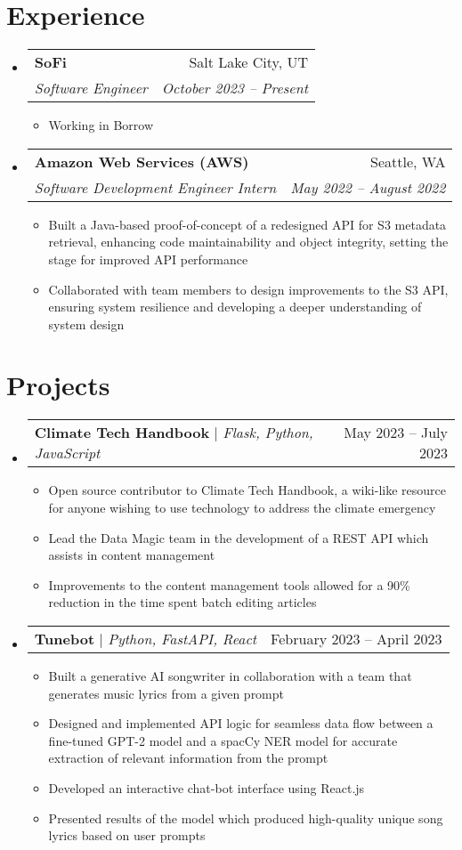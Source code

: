 \documentclass[letterpaper,11pt]{article}
\makeatletter
\newcommand{\resumeItem}[1]{
  \item\small{
    {#1 \vspace{-2pt}}
  }
}
\newcommand{\resumeSubheading}[4]{
  \vspace{-2pt}\item
    \begin{tabular*}{0.97\textwidth}[t]{l@{\extracolsep{\fill}}r}
      \textbf{#1} & #2 \\
      \textit{\small#3} & \textit{\small #4} \\
    \end{tabular*}\vspace{-7pt}
}
\newcommand{\resumeSubSubheading}[2]{
    \item
    \begin{tabular*}{0.97\textwidth}{l@{\extracolsep{\fill}}r}
      \textit{\small#1} & \textit{\small #2} \\
    \end{tabular*}\vspace{-7pt}
}
\newcommand{\resumeProjectHeading}[2]{
    \item
    \begin{tabular*}{0.97\textwidth}{l@{\extracolsep{\fill}}r}
      \small#1 & #2 \\
    \end{tabular*}\vspace{-7pt}
}
\newcommand{\resumeSubHeadingListStart}{\begin{itemize}[leftmargin=0.15in, label={}]}
\newcommand{\resumeSubHeadingListEnd}{\end{itemize}}
\newcommand{\resumeItemListStart}{\begin{itemize}}
\newcommand{\resumeItemListEnd}{\end{itemize}\vspace{-5pt}}
\makeatother
\begin{document}
\section{Experience}
  \resumeSubHeadingListStart
  \resumeSubheading
      {SoFi}{Salt Lake City, UT}
      {Software Engineer}{October 2023 -- Present}
      \resumeItemListStart
        \resumeItem{Working in Borrow}
     \resumeItemListEnd

    \resumeSubheading
      {Amazon Web Services (AWS)}{Seattle, WA}
      {Software Development Engineer Intern}{May 2022 -- August 2022}
      \resumeItemListStart
        \resumeItem{Built a Java-based proof-of-concept of a redesigned API for S3 metadata retrieval, enhancing code maintainability and object integrity, setting the stage for improved API performance}
        \resumeItem{
        Collaborated with team members to design improvements to the S3 API, ensuring system resilience and developing a deeper understanding of system design}
      \resumeItemListEnd
      

  \resumeSubHeadingListEnd

%

\section{Projects}
    \resumeSubHeadingListStart
     \resumeProjectHeading
          {\textbf{Climate Tech Handbook} $|$ \emph{Flask, Python, JavaScript}}{May 2023 -- July 2023}
          \resumeItemListStart
            \resumeItem{Open source contributor to Climate Tech Handbook, a wiki-like resource for anyone wishing to use technology to address the climate emergency}
            \resumeItem{Lead the Data Magic team in the development of a REST API which assists in content management}
            \resumeItem{Improvements to the content management tools allowed for a 90\% reduction in the time spent batch editing articles}
          \resumeItemListEnd
      \resumeProjectHeading
          {\textbf{Tunebot} $|$ \emph{Python, FastAPI, React}}{February 2023 -- April 2023}
          \resumeItemListStart
            \resumeItem{Built a generative AI songwriter in collaboration with a team that generates music lyrics from a given prompt}
            \resumeItem{Designed and implemented API logic for seamless data flow between a fine-tuned GPT-2 model and a spacCy NER model for accurate extraction of relevant information from the prompt}
            \resumeItem{Developed an interactive chat-bot interface using React.js}
             \resumeItem{Presented results of the model which produced high-quality unique song lyrics based on user prompts}
          \resumeItemListEnd
          \resumeItemListEnd
          
\end{document}
